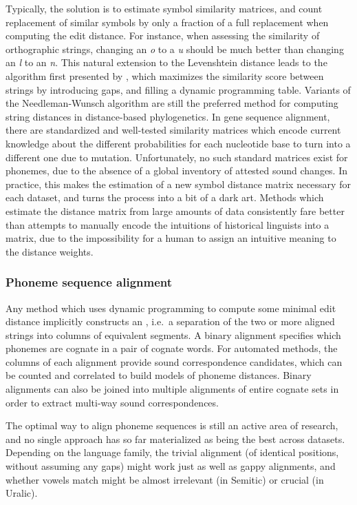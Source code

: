 Typically, the solution is to estimate symbol similarity matrices, and count replacement of similar symbols by only a fraction of a full replacement when computing the edit distance. For instance, when assessing the similarity of  orthographic strings, changing an \textit{o} to a \textit{u} should be much better than changing an \textit{l} to an \textit{n}. This natural extension to the Levenshtein distance leads to the algorithm first presented by \citet{needleman_wunsch_1970}, which maximizes the similarity score between strings by introducing gaps, and filling a dynamic programming table. Variants of the Needleman-Wunsch algorithm are still the preferred method for computing string distances in distance-based phylogenetics. In gene sequence alignment, there are standardized and well-tested similarity matrices which encode current knowledge about the different probabilities for each nucleotide base to turn into a different one due to mutation. Unfortunately, no such standard matrices exist for 
phonemes, due to the absence of a global inventory of attested sound changes. In practice, this makes the estimation of a new symbol distance matrix necessary for each dataset, and turns the process into a bit of a dark art. Methods which estimate the distance matrix from large amounts of data consistently fare better than attempts to manually encode the intuitions of historical linguists into a matrix, due to the impossibility for a human to assign an intuitive meaning to the distance weights.

\subsubsection{Phoneme sequence alignment}
Any method which uses dynamic programming to compute some minimal edit distance implicitly constructs an , i.e.\ a separation of the two or more aligned strings into columns of equivalent segments. A binary alignment specifies which phonemes are cognate in a pair of cognate words. For automated methods, the columns of each alignment provide sound correspondence candidates, which can be counted and correlated to build models of phoneme distances. Binary alignments can also be joined into multiple alignments of entire cognate sets in order to extract multi-way sound correspondences.

The optimal way to align phoneme sequences is still an active area of research, and no single approach has so far materialized as being the best across datasets. Depending on the language family, the trivial alignment (of identical positions, without assuming any gaps) might work just as well as gappy alignments, and whether vowels match might be almost irrelevant (in Semitic) or crucial (in Uralic).

